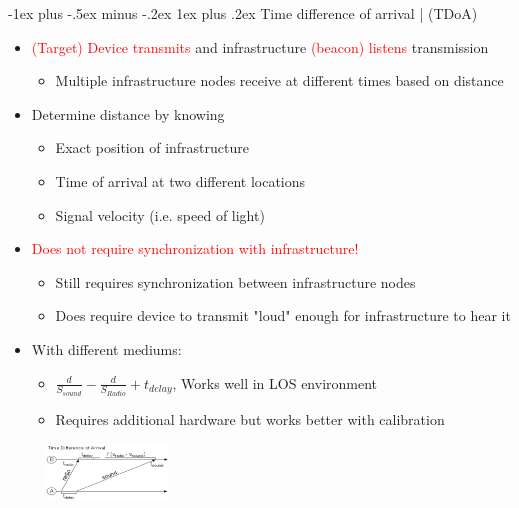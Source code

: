 \documentclass[10pt,landscape]{article}
\makeatletter
\newcommand{\subsubsubsection}{\@startsection{subsubsection}{3}{0mm}%
                                {-1ex plus -.5ex minus -.2ex}%
                                {1ex plus .2ex}%
                                {\normalfont\scriptsize\bfseries}}
\newcommand{\1}{\mathmybb{1}}
\makeatother
\begin{document}
\begin{multicols*}{3}
\subsubsubsection{Time difference of arrival | (TDoA)}
\begin{itemize}
  \item \textcolor{red}{(Target) Device transmits} and infrastructure \textcolor{red}{(beacon) listens} transmission
  \begin{itemize}
    \item Multiple infrastructure nodes receive at different times based on distance
  \end{itemize}
  \item Determine distance by knowing
  \begin{itemize}
    \item Exact position of infrastructure
    \item Time of arrival at two different locations
    \item Signal velocity (i.e. speed of light)
  \end{itemize}
  \item \textcolor{red}{Does not require synchronization with infrastructure!}
  \begin{itemize}
    \item Still requires synchronization between infrastructure nodes
    \item Does require device to transmit "loud" enough for infrastructure to hear it
  \end{itemize}
  \item With different mediums:
  \begin{multicols}{2}
    \begin{itemize}
      \item $\frac{d}{S_{sound}} - \frac{d}{S_{Radio}} + t_{delay}$, Works well in LOS environment
      \item Requires additional hardware but works better with calibration
    \end{itemize}
    \columnbreak
    \includegraphics*[width=4cm, height=1.5cm]{images/tdoa.png}
  \end{multicols}
\end{itemize}


\end{multicols*}
\end{document}
